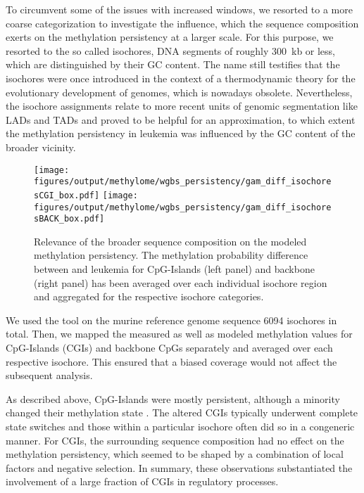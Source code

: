 To circumvent some of the issues with increased windows, we resorted to a more coarse categorization to investigate the influence, which the sequence composition exerts on the methylation persistency at a larger scale. For this purpose, we resorted to the so called isochores\cite{Thiery1976}, DNA segments of roughly \SI{300}{\kilo b} or less, which are distinguished by their GC content. The name still testifies that the isochores were once introduced in the context of a thermodynamic theory for the evolutionary development of genomes\cite{Bernardi1985}, which is nowadays obsolete\cite{Hurst2001,Eyre-Walker2001,Ream2003,Cohen2005,Romiguier2010}. Nevertheless, the isochore assignments relate to more recent units of genomic segmentation like LADs and TADs\cite{Jabbari2017} and proved to be helpful for an approximation, to which extent the methylation persistency in \dnmtchip \kitpos leukemia was influenced by the GC content of the broader vicinity. 

\begin{figure}[!htb]
	\centering
	\texttt{[image: figures/output/methylome/wgbs\_persistency/gam\_diff\_isochoresCGI\_box.pdf]}
	\texttt{[image: figures/output/methylome/wgbs\_persistency/gam\_diff\_isochoresBACK\_box.pdf]}
	\caption{Relevance of the broader sequence composition on the modeled methylation persistency. The methylation probability difference between \dnmtchip and \dnmtwt \kitpos leukemia for CpG-Islands (left panel) and backbone (right panel) has been averaged over each individual isochore region and aggregated for the respective isochore categories.}
	\label{fig:gam_diff_isochores}
\end{figure}

We used the \cite{Oliver2004} tool on the murine reference genome sequence \num{6094} isochores in total. Then, we mapped the measured as well as modeled methylation values for CpG-Islands (CGIs) and backbone CpGs separately and averaged over each respective isochore. This ensured that a biased coverage would not affect the subsequent analysis. 

As described above, CpG-Islands were mostly persistent, although a minority changed their methylation state	. The altered CGIs typically underwent complete state switches and those within a particular isochore often did so in a congeneric manner. For CGIs, the surrounding sequence composition had no effect on the methylation persistency, which seemed to be shaped by a combination of local factors and negative selection. In summary, these observations substantiated the involvement of a large fraction of CGIs in regulatory processes. 

